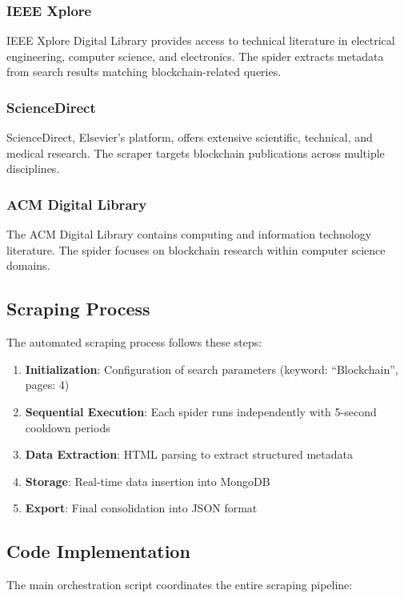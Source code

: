 \documentclass[12pt,a4paper]{article}
\begin{document}
\subsubsection{IEEE Xplore}
IEEE Xplore Digital Library provides access to technical literature in electrical engineering, computer science, and electronics. The spider extracts metadata from search results matching blockchain-related queries.

\subsubsection{ScienceDirect}
ScienceDirect, Elsevier's platform, offers extensive scientific, technical, and medical research. The scraper targets blockchain publications across multiple disciplines.

\subsubsection{ACM Digital Library}
The ACM Digital Library contains computing and information technology literature. The spider focuses on blockchain research within computer science domains.

\subsection{Scraping Process}

The automated scraping process follows these steps:

\begin{enumerate}[itemsep=0.5em]
    \item \textbf{Initialization}: Configuration of search parameters (keyword: ``Blockchain'', pages: 4)
    \item \textbf{Sequential Execution}: Each spider runs independently with 5-second cooldown periods
    \item \textbf{Data Extraction}: HTML parsing to extract structured metadata
    \item \textbf{Storage}: Real-time data insertion into MongoDB
    \item \textbf{Export}: Final consolidation into JSON format
\end{enumerate}

\subsection{Code Implementation}

The main orchestration script coordinates the entire scraping pipeline:
\end{document}
